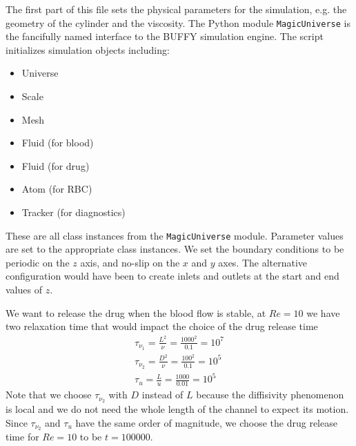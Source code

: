 \documentclass[11pt]{article} %
\newcommand{\tty}[1]{\texttt{#1}}
\begin{document}
The first part of this file sets the physical parameters for the simulation,
e.g. the geometry of the cylinder and the viscosity.
The Python module \tty{MagicUniverse} is the fancifully named interface to the BUFFY simulation engine.
The script initializes simulation objects including:
\begin{itemize}
\item Universe
\item Scale
\item Mesh
\item Fluid (for blood)
\item Fluid (for drug)
\item Atom (for RBC)
\item Tracker (for diagnostics)
\end{itemize}
These are all class instances from the \tty{MagicUniverse} module.
Parameter values are set to the appropriate class instances.
We set the boundary conditions to be periodic on the $z$ axis,
and no-slip on the $x$ and $y$ axes.
The alternative configuration would have been to create inlets and outlets
at the start and end values of $z$.

We want to release the drug when the blood flow is stable, at $Re=10$ we have two relaxation time that would impact the choice of the drug release time
\begin{gather*}
    \tau_{\nu_1} = \frac{L^2}{\nu} = \frac{1000^2}{0.1} = 10^7 \\
    \tau_{\nu_2} = \frac{D^2}{\nu} = \frac{100^2}{0.1} = 10^5 \\
    \tau_{u} = \frac{L}{u} = \frac{1000}{0.01} = 10^5
\end{gather*}
Note that we choose $\tau_{\nu_2}$ with $D$ instead of $L$ because the diffisivity phenomenon is local and we do not need the whole length of the channel to expect its motion. Since $\tau_{\nu_2}$ and $\tau_{u}$ have the same order of magnitude, we choose the drug release time for $Re=10$ to be $t = 100000$.
\end{document}
